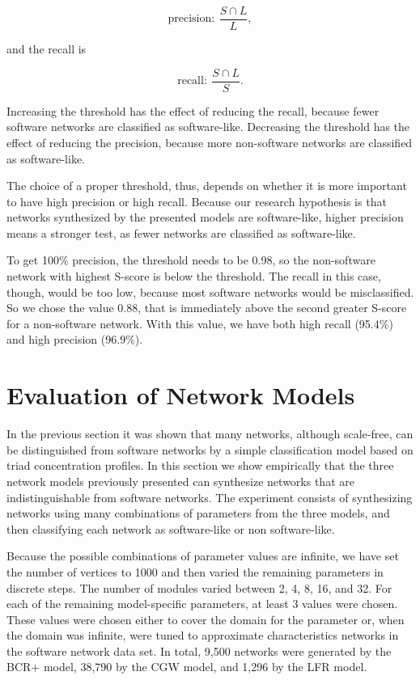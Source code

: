 $$
\mathrm{precision}: ~\frac{S \cap L}{L},
$$

and the recall is

$$
\mathrm{recall}: ~\frac{S \cap L}{S}.
$$

Increasing the threshold has the effect of reducing the recall, because fewer
software networks are classified as software-like. Decreasing the threshold has
the effect of reducing the precision, because more non-software networks are
classified as software-like. 

The choice of a proper threshold, thus, depends on whether it is more important
to have high precision or high recall. Because our research hypothesis is that
networks synthesized by the presented models are software-like, higher
precision means a stronger test, as fewer networks are classified as
software-like.

To get 100\% precision, the threshold needs to be 0.98, so the non-software
network with highest S-score is below the threshold. The recall in this case,
though, would be too low, because most software networks would be
misclassified. So we chose the value 0.88, that is immediately above the second
greater S-score for a non-software network. With this value, we have both high
recall (95.4\%) and high precision (96.9\%).


\section{Evaluation of Network Models} \label{sec:evaluation}

In the previous section it was shown that many networks, although scale-free,
can be distinguished from software networks by a simple classification model
based on triad concentration profiles. In this section we show empirically that
the three network models previously presented can synthesize networks that are
indistinguishable from software networks. The experiment consists of
synthesizing networks using many combinations of parameters from the three
models, and then classifying each network as software-like or non
software-like. 

Because the possible combinations of parameter values are infinite, we have set
the number of vertices to 1000 and then varied the remaining parameters in
discrete steps. The number of modules varied between 2, 4, 8, 16, and 32. For
each of the remaining model-specific parameters, at least 3 values were chosen.
These values were chosen either to cover the domain for the parameter or, when
the domain was infinite, were tuned to approximate characteristics networks in
the software network data set. In total, 9,500 networks were generated by the
BCR+ model, 38,790 by the CGW model, and 1,296 by the LFR model.

